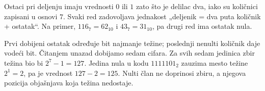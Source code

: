 
Ostaci pri deljenju imaju vrednosti $0$ ili $1$ zato što je delilac dva, iako su količnici zapisani u osnovi $7$. Svaki red zadovoljava jednakost „deljenik = dva puta količnik + ostatak“. Na primer, $116_7=62_{10}$ i $43_7=31_{10}$, pa drugi red ima ostatak nula.

Prvi dobijeni ostatak određuje bit najmanje težine; poslednji nenulti količnik daje vodeći bit. Čitanjem unazad dobijamo sedam cifara. Za svih sedam jedinica zbir težina bio bi $2^7-1=127$. Jedina nula u kodu $1111101_2$ zauzima mesto težine $2^1=2$, pa je vrednost $127-2=125$. Nulti član ne doprinosi zbiru, a njegova pozicija objašnjava koja težina nedostaje.
